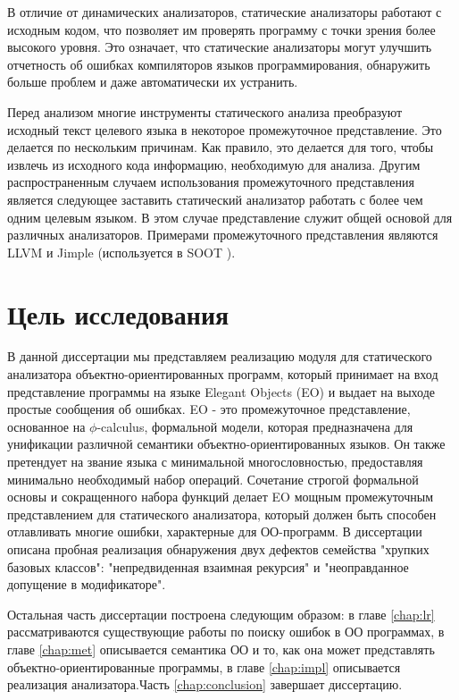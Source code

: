 В отличие от динамических анализаторов, статические анализаторы работают с исходным кодом, что позволяет им проверять программу с точки зрения более высокого уровня. Это означает, что статические анализаторы могут улучшить отчетность об ошибках компиляторов языков программирования, обнаружить больше проблем и даже автоматически их устранить.

Перед анализом многие инструменты статического анализа преобразуют исходный текст целевого языка в некоторое промежуточное представление. Это делается по нескольким причинам. Как правило, это делается для того, чтобы извлечь из исходного кода информацию, необходимую для анализа. Другим распространенным случаем использования промежуточного представления является следующее
заставить статический анализатор работать с более чем одним целевым языком. В этом случае представление служит общей основой для различных анализаторов. Примерами промежуточного представления являются LLVM \cite{llvm} и Jimple \cite{vallee1998jimple} (используется в SOOT \cite{vallee2010soot}).

\section{Цель исследования}

В данной диссертации мы представляем реализацию модуля для статического анализатора объектно-ориентированных программ, который принимает на вход представление программы на языке Elegant Objects (EO)\cite{eolang} и выдает на выходе простые сообщения об ошибках. EO - это промежуточное представление, основанное на $\phi$-calculus, формальной модели, которая предназначена для унификации различной семантики объектно-ориентированных языков. Он также претендует на звание языка с минимальной многословностью, предоставляя минимально необходимый набор операций. Сочетание строгой формальной основы и сокращенного набора функций делает EO мощным промежуточным представлением для статического анализатора, который должен быть способен отлавливать многие ошибки, характерные для ОО-программ. В диссертации описана пробная реализация обнаружения двух дефектов семейства "хрупких базовых классов"\cite{fragilebaseclass}: "непредвиденная взаимная рекурсия" и "неоправданное допущение в модификаторе".

Остальная часть диссертации построена следующим образом: в главе \ref{chap:lr} рассматриваются существующие работы по поиску ошибок в ОО программах, в главе \ref{chap:met} описывается семантика ОО и то, как она может представлять объектно-ориентированные программы, в главе \ref{chap:impl} описывается реализация анализатора.Часть \ref{chap:conclusion} завершает диссертацию.
